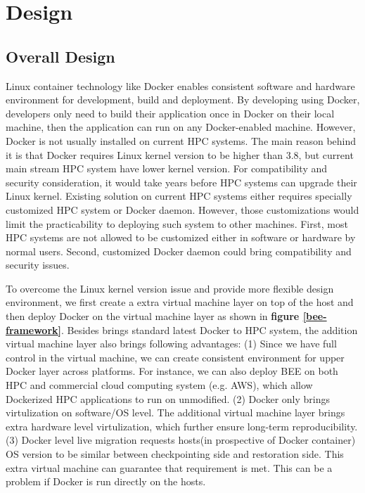 \section{Design}
  \label{sec:Design}
  \subsection{Overall Design}
Linux container technology like Docker enables consistent software and hardware environment for development, build and deployment. By developing using Docker, developers only need to build their application once in Docker on their local machine, then the application can run on any Docker-enabled machine. However, Docker is not usually installed on current HPC systems. The main reason behind it is that Docker requires Linux kernel version to be higher than 3.8, but current main stream HPC system have lower kernel version. For compatibility and security consideration, it would take years before HPC systems can upgrade their Linux kernel. Existing solution on current HPC systems either requires specially customized HPC system or Docker daemon. However, those customizations would limit the practicability to deploying such system to other machines. First, most HPC systems are not allowed to be customized either in software or hardware by normal users. Second, customized Docker daemon could bring compatibility and security issues. 
  
To overcome the Linux kernel version issue and provide more flexible design environment, we first create a extra virtual machine layer on top of the host and then deploy Docker on the virtual machine layer as shown in \textbf{figure \ref{bee-framework}}. Besides brings standard latest Docker to HPC system, the addition virtual machine layer also brings following advantages: (1) Since we have full control in the virtual machine, we can create consistent environment for upper Docker layer across platforms. For instance, we can also deploy BEE on both HPC and commercial cloud computing system (e.g. AWS), which allow Dockerized HPC applications to run on unmodified. (2) Docker only brings virtulization on software/OS level. The additional virtual machine layer brings extra hardware level virtulization, which further ensure long-term reproducibility. (3) Docker level live migration requests hosts(in prospective of Docker container) OS version to be similar between checkpointing side and restoration side. This extra virtual machine can guarantee that requirement is met. This can be a problem if Docker is run directly on the hosts.   

